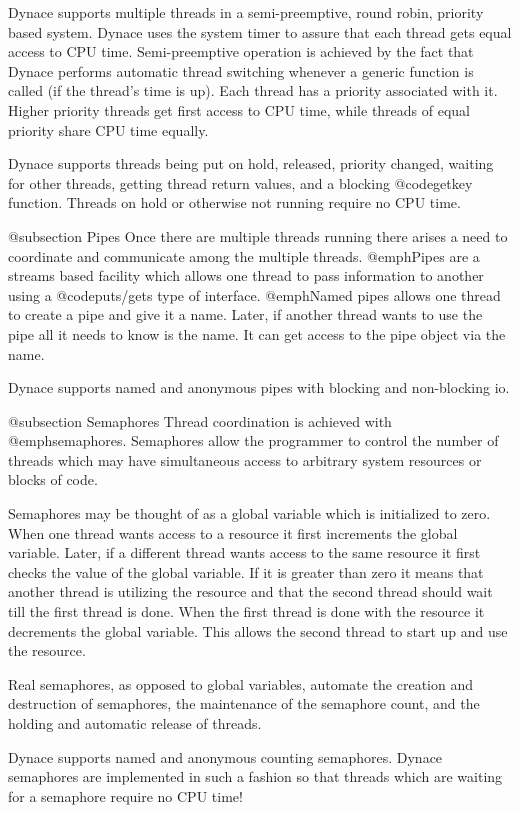 Dynace supports multiple threads in a semi-preemptive, round robin,
priority based system.  Dynace uses the system timer to assure that
each thread gets equal access to CPU time.  Semi-preemptive operation
is achieved by the fact that Dynace performs automatic thread
switching whenever a generic function is called (if the thread's time
is up).  Each thread has a priority associated with it.  Higher
priority threads get first access to CPU time, while threads of equal
priority share CPU time equally.

Dynace supports threads being put on hold, released, priority changed,
waiting for other threads, getting thread return values, and a
blocking @code{getkey} function.  Threads on hold or otherwise not
running require no CPU time.

@subsection Pipes
Once there are multiple threads running there arises a need to coordinate
and communicate among the multiple threads.  @emph{Pipes} are a
streams based facility which allows one thread to pass information
to another using a @code{puts/gets} type of interface.  @emph{Named pipes}
allows one thread to create a pipe and give it a name.  Later, if another
thread wants to use the pipe all it needs to know is the name.  It can
get access to the pipe object via the name.

Dynace supports named and anonymous pipes with blocking and non-blocking
io.

@subsection Semaphores
Thread coordination is achieved with @emph{semaphores}.  Semaphores allow
the programmer to control the number of threads which may have simultaneous
access to arbitrary system resources or blocks of code.

Semaphores may be thought of as a global variable which is initialized
to zero.  When one thread wants access to a resource it first increments
the global variable.  Later, if a different thread wants access to the
same resource it first checks the value of the global variable.  If it
is greater than zero it means that another thread is utilizing the
resource and that the second thread should wait till the first thread is
done.  When the first thread is done with the resource it decrements the
global variable.  This allows the second thread to start up and use
the resource.

Real semaphores, as opposed to global variables, automate the creation and
destruction of semaphores, the maintenance of the semaphore count, and
the holding and automatic release of threads.

Dynace supports named and anonymous counting semaphores.  Dynace semaphores
are implemented in such a fashion so that threads which are waiting for
a semaphore require no CPU time!

